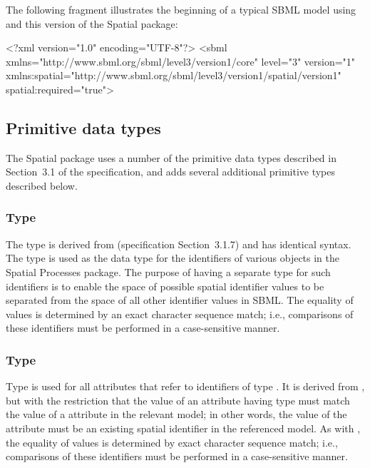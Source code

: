 The following fragment illustrates the beginning of a typical SBML model using \sbmlthreecore and this version of the Spatial package:

\begin{example}
<?xml version="1.0" encoding="UTF-8"?>
<sbml xmlns="http://www.sbml.org/sbml/level3/version1/core" level="3" version="1"
      xmlns:spatial="http://www.sbml.org/sbml/level3/version1/spatial/version1"
      spatial:required="true">
\end{example}


\subsection{Primitive data types}
\label{new-primitive-types}

The Spatial package uses a number of the primitive data types described in Section~3.1 of the \sbmlthreecore specification, and adds several additional primitive types described below.


\subsubsection{Type \fixttspace{}}
\label{primtype-SpId}

The type  is derived from 
(\sbmlthreecore specification Section~3.1.7) and has identical syntax. The  type is used as the data type for the identifiers of various objects in the Spatial Processes package.  The purpose of having a separate type for such identifiers is to enable the space of possible spatial identifier values to be separated from the space of all other identifier values in SBML.  The equality of  values is determined by an exact character sequence match; i.e., comparisons of these identifiers must be performed in a case-sensitive manner.


\subsubsection{Type \fixttspace{}}
\label{primtype-SpIdRef}

Type  is used for all attributes that refer to identifiers of type .  It is derived from , but with the restriction that the value of an attribute having type  must match the value of a  attribute in the relevant model;  in other words, the value of the attribute must be an existing spatial identifier in the referenced model.  As with , the equality of  values is determined by exact character sequence match; i.e., comparisons of these identifiers must be performed in a case-sensitive manner.


